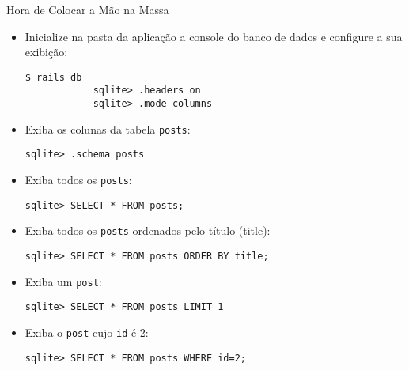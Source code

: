\begin{frame}{Hora de Colocar a Mão na Massa}
	\begin{itemize}
		\item Inicialize \alert{na pasta da aplicação} a console do banco de dados e
		configure a sua exibição:
		\begin{lstlisting}[style=BashInputBasicStyle]
			$ rails db
			sqlite> .headers on
			sqlite> .mode columns
		\end{lstlisting}
		
		\item Exiba os colunas da tabela \verb|posts|:
		\begin{lstlisting}[style=BashInputBasicStyle]
			sqlite> .schema posts
		\end{lstlisting}
		
		\framebreak
		\item Exiba todos os \verb|posts|:
		\begin{lstlisting}[style=BashInputBasicStyle]
			sqlite> SELECT * FROM posts;
		\end{lstlisting}
		
		\item Exiba todos os \verb|posts| ordenados pelo título (title):
		\begin{lstlisting}[style=BashInputBasicStyle]
			sqlite> SELECT * FROM posts ORDER BY title;
		\end{lstlisting}
		
		\item Exiba um \verb|post|:
		\begin{lstlisting}[style=BashInputBasicStyle]
			sqlite> SELECT * FROM posts LIMIT 1
		\end{lstlisting}
		
		\item Exiba o \verb|post| cujo \verb|id| é 2:
		\begin{lstlisting}[style=BashInputBasicStyle]
			sqlite> SELECT * FROM posts WHERE id=2;
		\end{lstlisting}
	\end{itemize}
\end{frame}